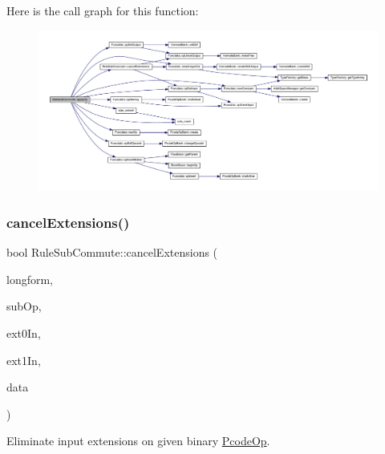 Here is the call graph for this function\+:
\nopagebreak
\begin{figure}[H]
\begin{center}
\leavevmode
\includegraphics[width=350pt]{class_rule_sub_commute_a346f3bfeee9d7233be7a17387ebc553f_cgraph}
\end{center}
\end{figure}
\mbox{\label{class_rule_sub_commute_a98082ac7f5395dbc0fd603a876417250}} 
\subsubsection{\texorpdfstring{cancelExtensions()}{cancelExtensions()}}
{\footnotesize\ttfamily bool Rule\+Sub\+Commute\+::cancel\+Extensions (\begin{DoxyParamCaption}\item[{\mbox{\hyperlink{class_pcode_op}{Pcode\+Op}} $\ast$}]{longform,  }\item[{\mbox{\hyperlink{class_pcode_op}{Pcode\+Op}} $\ast$}]{sub\+Op,  }\item[{\mbox{\hyperlink{class_varnode}{Varnode}} $\ast$}]{ext0\+In,  }\item[{\mbox{\hyperlink{class_varnode}{Varnode}} $\ast$}]{ext1\+In,  }\item[{\mbox{\hyperlink{class_funcdata}{Funcdata}} \&}]{data }\end{DoxyParamCaption})\hspace{0.3cm}{\ttfamily [static]}}



Eliminate input extensions on given binary \mbox{\hyperlink{class_pcode_op}{Pcode\+Op}}. 

